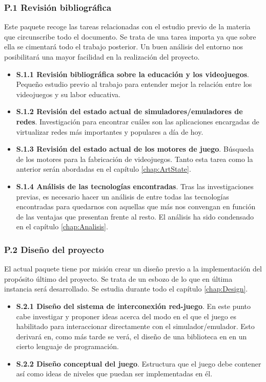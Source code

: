 \subsubsection{P.1 Revisión bibliográfica}
Este paquete recoge las tareas relacionadas con el estudio previo de la materia que circunscribe todo el documento. Se trata de una tarea importa ya que sobre ella se cimentará todo el trabajo posterior. Un buen análisis del entorno nos posibilitará una mayor facilidad en la realización del proyecto.
\begin{itemize}
\item \textbf{S.1.1 Revisión bibliográfica sobre la educación y los videojuegos}. Pequeño estudio previo al trabajo para entender mejor la relación entre los videojuegos y su labor educativa.
\item \textbf{S.1.2 Revisión del estado actual de simuladores/emuladores de redes}. Investigación para encontrar cuáles son las aplicaciones encargadas de virtualizar redes más importantes y populares a día de hoy.
\item \textbf{S.1.3 Revisión del estado actual de los motores de juego}. Búsqueda de los motores para la fabricación de videojuegos. Tanto esta tarea como la anterior serán abordadas en el capítulo \ref{chap:ArtState}.
\item \textbf{S.1.4 Análisis de las tecnologías encontradas}. Tras las investigaciones previas, es necesario hacer un análisis de entre todas las tecnologías encontradas para quedarnos con aquellas que más nos convengan en función de las ventajas que presentan frente al resto. El análisis ha sido condensado en el capítulo \ref{chap:Analisis}.
\end{itemize}

\subsubsection{P.2 Diseño del proyecto}
El actual paquete tiene por misión crear un diseño previo a la implementación del propósito último del proyecto. Se trata de un esbozo de lo que en última instancia será desarrollado. Se estudia durante todo el capítulo \ref{chap:Design}.
\begin{itemize}
\item \textbf{S.2.1 Diseño del sistema de interconexión red-juego}. En este punto cabe investigar y proponer ideas acerca del modo en el que el juego es habilitado para interaccionar directamente con el simulador/emulador. Esto derivará en, como más tarde se verá, el diseño de una biblioteca en en un cierto lenguaje de programación.
\item \textbf{S.2.2 Diseño conceptual del juego}. Estructura que el juego debe contener así como ideas de niveles que puedan ser implementadas en él.
\end{itemize}

